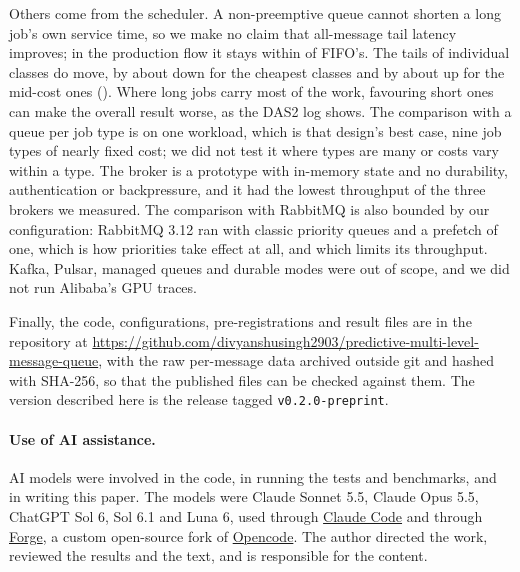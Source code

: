Others come from the scheduler. A non-preemptive queue cannot shorten a long job's own service time, so we make no claim that
all-message tail latency improves; in the production flow it stays within \EOnePNinetyNine{} of FIFO's. The tails of individual classes do move, by about \PerClassCheapPNinetyNineCut{} down for the cheapest classes and by about \PerClassMidPNinetyNineMax{} up for the mid-cost ones (). Where long jobs carry most of the work, favouring short ones can make the overall result worse, as
the DAS2 log shows. The comparison with a queue per job type is on one workload, which is that design's best case, nine job types of nearly fixed cost; we did not test it where types are many or costs vary within a type. The broker is a prototype with in-memory state and no durability, authentication or backpressure, and it
had the lowest throughput of the three brokers we measured. The comparison with RabbitMQ is also bounded by our
configuration: RabbitMQ 3.12 ran with classic priority queues and a prefetch of one, which is how priorities take effect at all, and which limits its
throughput. Kafka, Pulsar, managed queues and durable modes were out of scope, and we did not run Alibaba's GPU traces.

Finally, the code, configurations, pre-registrations and result files are in the repository at
\url{https://github.com/divyanshusingh2903/predictive-multi-level-message-queue}, with the raw per-message data archived
outside git and hashed with SHA-256, so that the published files can be checked against them. The version described here is the release tagged \texttt{v0.2.0-preprint}.

\paragraph{Use of AI assistance.} AI models were involved in the code, in running the tests and benchmarks, and in writing this paper. The models were Claude Sonnet 5.5, Claude Opus 5.5, ChatGPT Sol 6, Sol 6.1 and Luna 6, used through \href{https://claude.com/claude-code}{Claude Code} and through \href{https://divyanshusingh.site/forge}{Forge}, a custom open-source fork of \href{https://opencode.ai}{Opencode}. The author directed the work, reviewed the results and the text, and is responsible for the content.
